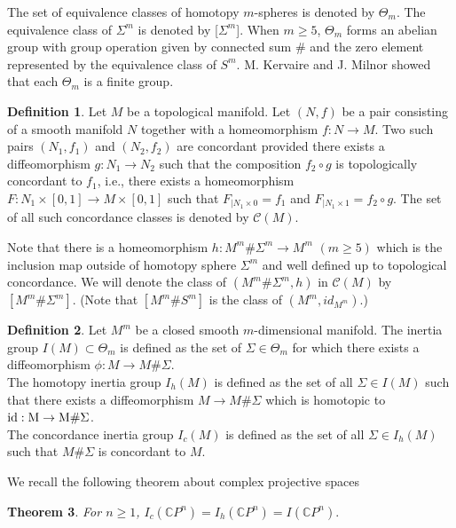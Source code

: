 \documentclass[a4paper,leqno,12pt]{amsart}
\theoremstyle{plain}
\newtheorem{theorem}{Theorem}[section]
\theoremstyle{definition}
\newtheorem{defn}[theorem]{Definition}
\numberwithin{equation}{section}
\begin{document}
The set of equivalence classes of homotopy $m$-spheres is denoted by $\Theta_m$. The equivalence class of $\Sigma^m$ is denoted by [$\Sigma^m$]. When $m\geq 5$, $\Theta_m$ forms an abelian group with group operation given by connected sum $\#$ and the zero element represented by the equivalence class  of $S^m$. M. Kervaire and J. Milnor \cite{KM63} showed that each  $\Theta_m$ is a finite group.

\begin{defn}
Let $M$ be a topological manifold. Let $(N,f)$ be a pair consisting of a smooth manifold $N$ together with a homeomorphism $f:N\to M$. Two such pairs $(N_{1},f_{1})$ and $(N_{2},f_{2})$ are concordant provided there exists a diffeomorphism $g:N_{1}\to N_{2}$ such that the composition $f_{2}\circ g$ is topologically concordant to $f_{1}$, i.e., there exists a homeomorphism $F: N_{1}\times [0,1]\to M\times [0,1]$ such that $F_{|N_{1}\times 0}=f_{1}$ and $F_{|N_{1}\times 1}=f_{2}\circ g$. The set of all such concordance classes is denoted by $\mathcal{C}(M)$.
\end{defn}

 Note that there is a homeomorphism $h: M^m\#\Sigma^m \to M^m$ $(m\geq5)$ which is the inclusion map outside of homotopy sphere $\Sigma^m$ and well defined up to topological concordance. We will denote the class of $(M^m\#\Sigma^m, h)$  in $\mathcal{C}(M)$  by $[M^m\#\Sigma^m]$. (Note that $[M^m\#S^m]$ is the class of $(M^m, id_{M^m})$.)\\

\begin{defn}
Let $M^m$ be a closed smooth $m$-dimensional manifold. The inertia group $I(M)\subset \Theta_{m}$ is defined as the set of $\Sigma \in \Theta_{m}$ for which there exists a diffeomorphism $\phi :M\to M\#\Sigma$.\\
The homotopy inertia group $I_h(M)$  is defined as the set of all $\Sigma\in I(M)$ such that there exists a diffeomorphism $M\to M\#\Sigma$ which is homotopic to $\rm{id}:M \to M\#\Sigma$.\\
The concordance inertia group $I_c(M)$ is defined as the set of all $\Sigma\in I_h(M)$ such that $M\#\Sigma$ is concordant to $M$.
\end{defn}

We recall the following theorem about complex projective spaces
\begin{theorem}{\rm \cite[Theorem 4.2]{Ram14}}\label{first}
For $n \geq 1$, $I_c(\mathbb{C}P^{n})=I_h(\mathbb{C}P^{n})=I(\mathbb{C}P^{n}).$
\end{theorem}
\end{document}
